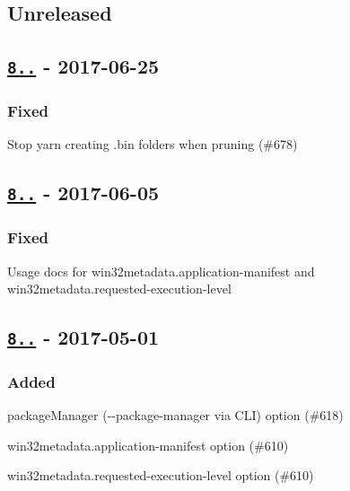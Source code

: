 \subsection*{Unreleased}

\subsection*{\href{https://github.com/electron-userland/electron-packager/compare/v8.7.1...v8.7.2}{\tt 8..} -\/ 2017-\/06-\/25}

\subsubsection*{Fixed}


\begin{DoxyItemize}
\item Stop yarn creating {\ttfamily .bin} folders when pruning (\#678)
\end{DoxyItemize}

\subsection*{\href{https://github.com/electron-userland/electron-packager/compare/v8.7.0...v8.7.1}{\tt 8..} -\/ 2017-\/06-\/05}

\subsubsection*{Fixed}


\begin{DoxyItemize}
\item Usage docs for {\ttfamily win32metadata.\+application-\/manifest} and {\ttfamily win32metadata.\+requested-\/execution-\/level}
\end{DoxyItemize}

\subsection*{\href{https://github.com/electron-userland/electron-packager/compare/v8.6.0...v8.7.0}{\tt 8..} -\/ 2017-\/05-\/01}

\subsubsection*{Added}


\begin{DoxyItemize}
\item {\ttfamily package\+Manager} ({\ttfamily -\/-\/package-\/manager} via C\+LI) option (\#618)
\item {\ttfamily win32metadata.\+application-\/manifest} option (\#610)
\item {\ttfamily win32metadata.\+requested-\/execution-\/level} option (\#610)
\end{DoxyItemize}

